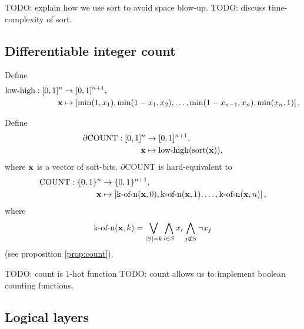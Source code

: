 \documentclass{article} %
\begin{document}
TODO: explain how we use sort to avoid space blow-up.
TODO: discuss time-complexity of sort.

\subsection{Differentiable integer count}

Define 
\begin{equation*}
\begin{aligned}
\operatorname{low-high}: [0,1]^{n} &\to [0,1]^{n+1},\\
{\bf x} &\mapsto \left[ \operatorname{min}(1, x_{1}), \operatorname{min}(1 - x_{1}, x_{2}), \dots, \operatorname{min}(1 - x_{n-1}, x_{n}), \operatorname{min}(x_{n}, 1) \right]\text{.}
\end{aligned}
\end{equation*}

Define
\begin{equation*}
\begin{aligned}
\partial\text{COUNT}: [0,1]^{n} &\to [0,1]^{n+1}, \\
{\bf x} &\mapsto \operatorname{low-high}(\operatorname{sort}({\bf x}))\text{,}
\end{aligned}
\end{equation*}
where ${\bf x}$ is a vector of soft-bits. $\partial${COUNT} is hard-equivalent to
\begin{equation*}
\begin{aligned}
\text{COUNT}: \{0,1\}^{n} &\to \{0,1\}^{n+1}, \\
{\bf x} &\mapsto \left[\operatorname{k-of-n}({\bf x}, 0), \operatorname{k-of-n}({\bf x}, 1), \dots, \operatorname{k-of-n}({\bf x}, n)\right]\text{,}
\end{aligned}
\end{equation*}
where
\begin{equation*}
\operatorname{k-of-n}({\bf x}, k) = \bigvee_{|S|=k} \bigwedge_{i\in S} x_i \bigwedge_{j\notin S} \neg x_j
\end{equation*}
(see proposition \ref{prop:count}).


TODO: count is 1-hot function
TODO: count allows us to implement boolean counting functions.

\subsection{Logical layers}
\end{document}
